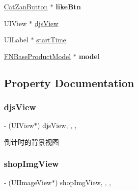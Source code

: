 \begin{DoxyCompactItemize}
\mbox{\hyperlink{interface_cat_zan_button}{Cat\+Zan\+Button}} $\ast$ {\bfseries like\+Btn}
\item 
U\+I\+View $\ast$ \mbox{\hyperlink{interface_x_y_h_rebates_cell_a8280882d99b8af553dfda779e0c0bd6d}{djs\+View}}
\item 
U\+I\+Label $\ast$ \mbox{\hyperlink{interface_x_y_h_rebates_cell_ae144a3ace5765c966210fea8831a446b}{start\+Time}}
\item 
\mbox{\label{interface_x_y_h_rebates_cell_a86a547401792c258c8d784b1e7010580}} 
\mbox{\hyperlink{interface_f_n_base_product_model}{F\+N\+Base\+Product\+Model}} $\ast$ {\bfseries model}
\end{DoxyCompactItemize}


\subsection{Property Documentation}
\mbox{\label{interface_x_y_h_rebates_cell_a8280882d99b8af553dfda779e0c0bd6d}} 
\subsubsection{\texorpdfstring{djs\+View}{djsView}}
{\footnotesize\ttfamily -\/ (U\+I\+View$\ast$) djs\+View\hspace{0.3cm}{\ttfamily [read]}, {\ttfamily [write]}, {\ttfamily [nonatomic]}, {\ttfamily [strong]}}

倒计时的背景视图 \mbox{\label{interface_x_y_h_rebates_cell_aaa116d78cee16c22cffed711f478d961}} 
\subsubsection{\texorpdfstring{shop\+Img\+View}{shopImgView}}
{\footnotesize\ttfamily -\/ (U\+I\+Image\+View$\ast$) shop\+Img\+View\hspace{0.3cm}{\ttfamily [read]}, {\ttfamily [write]}, {\ttfamily [nonatomic]}, {\ttfamily [strong]}}

